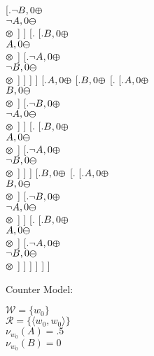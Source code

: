 \documentclass{article}
\begin{document}
[.{$\neg B, 0\varoplus $ \\ $\neg A, 0\varominus $ \\ $ \varotimes  $}  ]  ] 
[.{} [.{$B, 0\varoplus $ \\ $A, 0\varominus $ \\ $ \varotimes  $}  ] 
[.{$\neg A, 0\varoplus $ \\ $\neg B, 0\varominus $ \\ $ \varotimes  $}  ]  ]  ]  ] 
[.{$A, 0\varoplus $} [.{$B, 0\varoplus $} [.{} [.{$A, 0\varoplus $ \\ $B, 0\varominus $ \\ $ \varotimes  $}  ] 
[.{$\neg B, 0\varoplus $ \\ $\neg A, 0\varominus $ \\ $ \varotimes  $}  ]  ] 
[.{} [.{$B, 0\varoplus $ \\ $A, 0\varominus $ \\ $ \varotimes  $}  ] 
[.{$\neg A, 0\varoplus $ \\ $\neg B, 0\varominus $ \\ $ \varotimes  $}  ]  ]  ] 
[.{$B, 0\varoplus $} [.{} [.{$A, 0\varoplus $ \\ $B, 0\varominus $ \\ $ \varotimes  $}  ] 
[.{$\neg B, 0\varoplus $ \\ $\neg A, 0\varominus $ \\ $ \varotimes  $}  ]  ] 
[.{} [.{$B, 0\varoplus $ \\ $A, 0\varominus $ \\ $ \varotimes  $}  ] 
[.{$\neg A, 0\varoplus $ \\ $\neg B, 0\varominus $ \\ $ \varotimes  $}  ]  ]  ]  ]  ]  ]\bigskip

Counter Model: 

\bigskip
\noindent $\mathcal{W} = \{ w_0\} $\\
$\mathcal{R} = \{ \langle w_0,w_0 \rangle \} $\\
$ \mathcal{\nu}_{w_0}(A)=.5 $ \\
$ \mathcal{\nu}_{w_0}(B)=0 $ \\
\bigskip




 
\end{document}
